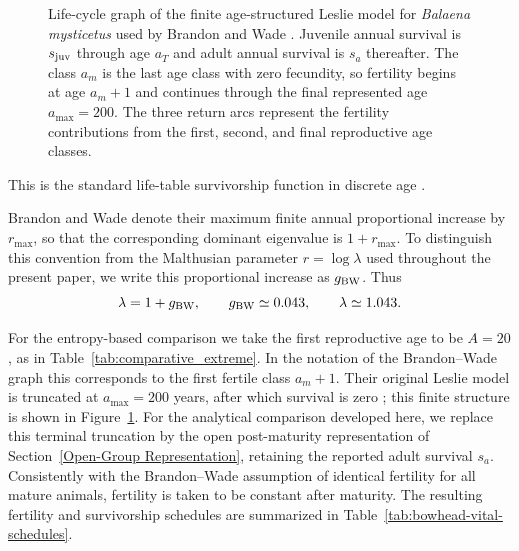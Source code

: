 \documentclass[11pt,a4paper]{amsart}
\begin{document}
\begin{figure}[ht]

\caption{Life-cycle graph of the finite age-structured Leslie model
for \textit{Balaena mysticetus} used by Brandon and Wade
\cite{BrandonWade2006}. Juvenile annual survival is $s_{\rm juv}$
through age $a_T$ and adult annual survival is $s_a$ thereafter.
The class $a_m$ is the last age class with zero fecundity, so
fertility begins at age $a_m+1$ and continues through the final
represented age $a_{\max}=200$. The three return arcs represent the
fertility contributions from the first, second, and final
reproductive age classes.}
\label{fig:bowhead-leslie-graph}

\end{figure}



This is the standard life-table survivorship function in discrete
age \cite{KeyfitzCaswell2005}.

Brandon and Wade \cite{BrandonWade2006} denote their maximum finite
annual proportional increase by $r_{\max}$, so that the corresponding
dominant eigenvalue is $1+r_{\max}$. To distinguish this convention
from the Malthusian parameter $r=\log\lambda$ used throughout the
present paper, we write this proportional increase as $g_{\rm BW}$.
Thus
\begin{equation}
\lambda=1+g_{\rm BW},
\qquad
g_{\rm BW}\simeq0.043,
\qquad
\lambda\simeq1.043.
\label{eq:bowhead-lambda}
\end{equation}

For the entropy-based comparison we take the first reproductive age
to be $A=20$, as in Table~\ref{tab:comparative_extreme}. In the
notation of the Brandon--Wade graph this corresponds to the first
fertile class $a_m+1$. Their original Leslie model is truncated at
$a_{\max}=200$ years, after which survival is zero
\cite{BrandonWade2006}; this finite structure is shown in
Figure~\ref{fig:bowhead-leslie-graph}. For the analytical comparison
developed here, we replace this terminal truncation by the open
post-maturity representation of
Section~\ref{Open-Group Representation}, retaining the reported
adult survival $s_a$. Consistently with the Brandon--Wade assumption
of identical fertility for all mature animals, fertility is taken
to be constant after maturity. The resulting fertility and
survivorship schedules are summarized in
Table~\ref{tab:bowhead-vital-schedules}.
\end{document}
